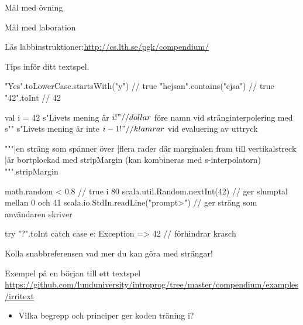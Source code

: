 



\begin{Slide}{Mål med övning \ExeWeekTHREE}
\begin{itemize}\SlideFontSmall
  
\end{itemize}
\end{Slide}

\begin{Slide}{Mål med laboration \LabWeekTHREE}
\begin{itemize}
  
\end{itemize}
Läs labbinstruktioner:\url{http://cs.lth.se/pgk/compendium/}
\end{Slide}


\begin{Slide}{Tips inför ditt textspel.}
\begin{Code}
"Yes".toLowerCase.startsWith("y")    // true
"hejsan".contains("ejsa")            // true
"42".toInt                           // 42

val i = 42
s"Livets mening är $i!" // dollar $ före namn vid stränginterpolering med s""
s"Livets mening är inte ${i-1}!"  // klamrar ${} vid evaluering av uttryck

"""|en sträng som spänner över
   |flera rader där marginalen fram till vertikalstreck
   |är bortplockad med stripMargin (kan kombineras med s-interpolatorn)
""".stripMargin

math.random < 0.8                  // true i 80%
scala.util.Random.nextInt(42)      // ger slumptal mellan 0 och 41
scala.io.StdIn.readLine("prompt>") // ger sträng som användaren skriver

try { "?".toInt } catch { case e: Exception => 42 }  // förhindrar krasch

\end{Code}
Kolla snabbreferensen vad mer du kan göra med strängar!
\end{Slide}

\begin{Slide}{Exempel på en början till ett textspel}
  \url{https://github.com/lunduniversity/introprog/tree/master/compendium/examples/irritext}

\begin{itemize}
  \item Vilka begrepp och principer ger koden träning i?
\end{itemize}

\end{Slide}



